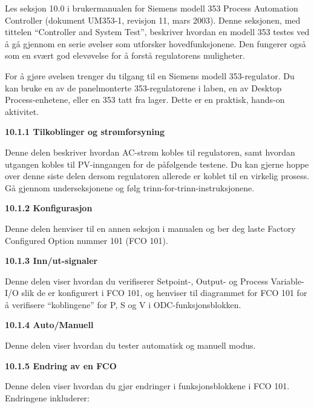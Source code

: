 

Les seksjon 10.0 i brukermanualen for Siemens modell 353 Process Automation Controller (dokument UM353-1, revisjon 11, mars 2003). Denne seksjonen, med tittelen ``Controller and System Test'', beskriver hvordan en modell 353 testes ved å gå gjennom en serie øvelser som utforsker hovedfunksjonene. Den fungerer også som en svært god elevøvelse for å forstå regulatorens muligheter.

For å gjøre øvelsen trenger du tilgang til en Siemens modell 353-regulator. Du kan bruke en av de panelmonterte 353-regulatorene i laben, en av Desktop Process-enhetene, eller en 353 tatt fra lager. Dette er en praktisk, hands-on aktivitet.

\vskip 10pt

\noindent
{\bf 10.1.1 Tilkoblinger og strømforsyning}

Denne delen beskriver hvordan AC-strøm kobles til regulatoren, samt hvordan utgangen kobles til PV-inngangen for de påfølgende testene. Du kan gjerne hoppe over denne siste delen dersom regulatoren allerede er koblet til en virkelig prosess. Gå gjennom underseksjonene og følg trinn-for-trinn-instruksjonene.

\vskip 30pt

\noindent
{\bf 10.1.2 Konfigurasjon}

Denne delen henviser til en annen seksjon i manualen og ber deg laste Factory Configured Option nummer 101 (FCO 101).

\vskip 30pt

\noindent
{\bf 10.1.3 Inn/ut-signaler}

Denne delen viser hvordan du verifiserer Setpoint-, Output- og Process Variable-I/O slik de er konfigurert i FCO 101, og henviser til diagrammet for FCO 101 for å verifisere ``koblingene'' for P, S og V i ODC-funksjonsblokken.

\vskip 30pt

\noindent
{\bf 10.1.4 Auto/Manuell}

Denne delen viser hvordan du tester automatisk og manuell modus.

\vskip 30pt

\noindent
{\bf 10.1.5 Endring av en FCO}

Denne delen viser hvordan du gjør endringer i funksjonsblokkene i FCO 101. Endringene inkluderer:

